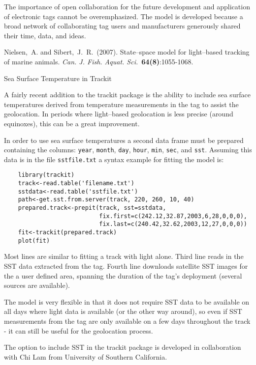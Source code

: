 \documentclass[11pt]{article}
\begin{document}
The importance of open collaboration for the future development and
application of electronic tags cannot be overemphasized. The model is
developed because a broad network of collaborating tag users and
manufacturers generously shared their time, data, and ideas.
\vspace{-1cm}
\begin{thebibliography}{}
\vspace{-0.75cm}
Nielsen,~A. and Sibert,~J.~R.~(2007).
{State--space model for light--based tracking of marine animals}.
{\it Can. J. Fish. Aquat. Sci.}~{\bf 64(8)}:1055-1068. 
\end{thebibliography}
\newpage 
\begin{center}
{\huge Sea Surface Temperature in Trackit}
\end{center}
\Large
\thispagestyle{empty}
A fairly recent addition to the trackit package is the ability to 
include sea surface temperatures derived from temperature measurements 
in the tag to assist the geolocation. In periods where light--based 
geolocation is less precise (around equinoxes), this can be a great 
improvement. 

In order to use sea surface temperatures a second data frame must be 
prepared containing the columns: {\color{blue}\verb#year#},
{\color{blue}\verb#month#}, {\color{blue}\verb#day#}, 
{\color{blue}\verb#hour#}, {\color{blue}\verb#min#}, 
{\color{blue}\verb#sec#}, and {\color{blue}\verb#sst#}. Assuming this 
data is in the file {\color{blue}\verb#sstfile.txt#} a syntax example 
for fitting the model is:   
{\color{red}
\begin{small}
\begin{verbatim}
    library(trackit)
    track<-read.table('filename.txt')
    sstdata<-read.table('sstfile.txt')
    path<-get.sst.from.server(track, 220, 260, 10, 40)
    prepared.track<-prepit(track, sst=sstdata,
                           fix.first=c(242.12,32.87,2003,6,28,0,0,0),
                           fix.last=c(240.42,32.62,2003,12,27,0,0,0))
    fit<-trackit(prepared.track)
    plot(fit)
\end{verbatim}
\end{small}}
Most lines are similar to fitting a track with light alone. Third 
line reads in the SST data extracted from the tag. Fourth line 
downloads satellite SST images for the a user defined area, spanning 
the duration of the tag's deployment (several sources are available).  

The model is very flexible in that it does not require SST data to be 
available on all days where light data is available (or the other way 
around), so even if SST measurements from the tag are only available 
on a few days throughout the track - it can still be useful for the 
geolocation process.  

The option to include SST in the trackit package is developed in 
collaboration with Chi Lam from University of Southern California.
\end{document}
